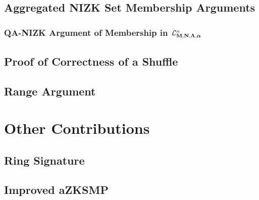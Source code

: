     \section{Aggregated NIZK Set Membership Arguments} \label{sec:aZKSMP}

        

        \subsection{QA-NIZK Argument of Membership in $\mathcal{L}_{\mathbf{{M}},\mathbf{{N}},\mathbf{{\Lambda}},{\boldsymbol \alpha}}^n$} \label{sec:bin-lan-constr}

            

    \section{Proof of Correctness of a Shuffle} \label{sec:shuffle}

        

    \section{Range Argument} \label{sec:range-proof}

        

\chapter{Other Contributions}

    \section{Ring Signature}

        

    \section{Improved aZKSMP}

        
